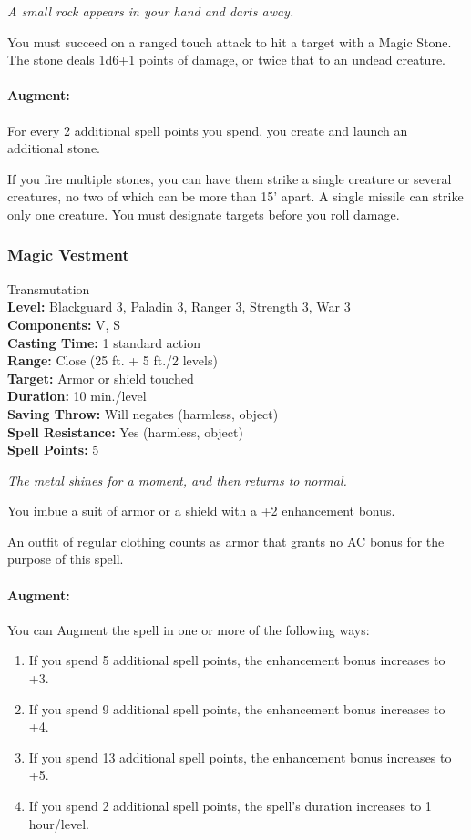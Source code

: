 \emph{A small rock appears in your hand and darts away.}

You must succeed on a ranged touch attack to hit a target with a Magic Stone.
The stone deals 1d6+1 points of damage, or twice that to an undead creature.

\paragraph{Augment:} For every 2 additional spell points you spend, you create and launch an additional stone.

If you fire multiple stones, you can have them strike a single creature or several creatures, no two of which can be more than 15' apart.
A single missile can strike only one creature. You must designate targets before you roll damage.
\subsubsection{Magic Vestment}
\label{Spell:MagicVestment}
Transmutation
\\ \textbf{Level:} Blackguard 3, Paladin 3, Ranger 3, Strength 3, War 3
\\ \textbf{Components:} V, S
\\ \textbf{Casting Time:} 1 standard action
\\ \textbf{Range:} Close (25 ft. + 5 ft./2 levels)
\\ \textbf{Target:} Armor or shield touched
\\ \textbf{Duration:} 10 min./level
\\ \textbf{Saving Throw:} Will negates (harmless, object)
\\ \textbf{Spell Resistance:} Yes (harmless, object)
\\ \textbf{Spell Points:} 5

\emph{The metal shines for a moment, and then returns to normal.}

You imbue a suit of armor or a shield with a +2 enhancement bonus.

An outfit of regular clothing counts as armor that grants no AC bonus for the purpose of this spell.

\paragraph{Augment:} You can Augment the spell in one or more of the following ways:
\begin{enumerate}
 \item If you spend 5 additional spell points, the enhancement bonus increases to +3.
 \item If you spend 9 additional spell points, the enhancement bonus increases to +4.
 \item If you spend 13 additional spell points, the enhancement bonus increases to +5.
 \item If you spend 2 additional spell points, the spell's duration increases to 1 hour/level.
\end{enumerate}
